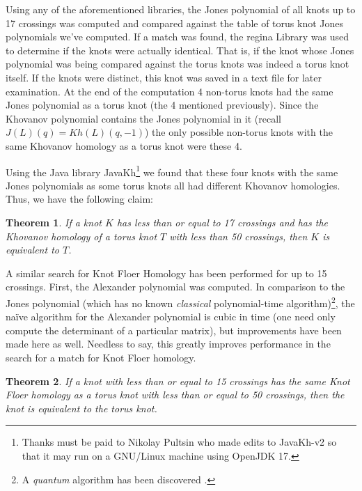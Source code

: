 \documentclass{article}
\theoremstyle{plain}
\newtheorem{theorem}{Theorem}
\begin{document}
	    Using any of the aforementioned libraries, the Jones polynomial of all
	    knots up to 17 crossings was computed and compared against the table of
	    torus knot Jones polynomials we've computed. If a match was found,
	    the regina Library was used to determine if the knots were actually
	    identical. That is, if the knot whose Jones polynomial was being
	    compared against the torus knots was indeed a torus knot itself. If the
	    knots were distinct, this knot was saved in a text file for later
	    examination. At the end of the computation 4 non-torus knots had the
	    same Jones polynomial as a torus knot (the 4 mentioned previously).
	    Since the Khovanov polynomial contains the Jones polynomial in it
	    (recall $J(L)(q)=Kh(L)(q,-1)$) the only possible non-torus knots with
	    the same Khovanov homology as a torus knot were these 4.
	    \par\hfill\par
        Using the Java library JavaKh\footnote{%
            Thanks must be paid to Nikolay Pultsin who made edits to
            JavaKh-v2 so that it may run on a GNU/Linux machine using
            OpenJDK 17.
        }
        we found that these four knots with the same Jones polynomials as some
        torus knots all had different Khovanov homologies. Thus, we have the
        following claim:
        \begin{theorem}
            If a knot $K$ has less than or equal to 17 crossings and has the
            Khovanov homology of a torus knot $T$ with less than 50 crossings,
            then $K$ is equivalent to $T$.
        \end{theorem}
        A similar search for Knot Floer Homology has been performed for up to 15
        crossings. First, the Alexander polynomial was computed.
        In comparison to the Jones polynomial (which has no known
        \textit{classical} polynomial-time algorithm)\footnote{%
            A \textit{quantum} algorithm has been discovered
            \cite{JonesQuantumAlgorithm}.
        }, the na\"{i}ve algorithm for the Alexander polynomial is cubic in
        time (one need only compute the determinant of a particular matrix), but
        improvements have been made here as well. Needless to say, this greatly
        improves performance in the search for a match for Knot Floer homology.
        \begin{theorem}
            If a knot with less than or equal to 15 crossings has the same
            Knot Floer homology as a torus knot with less than or equal to 50
            crossings, then the knot is equivalent to the torus knot.
        \end{theorem}
\end{document}
